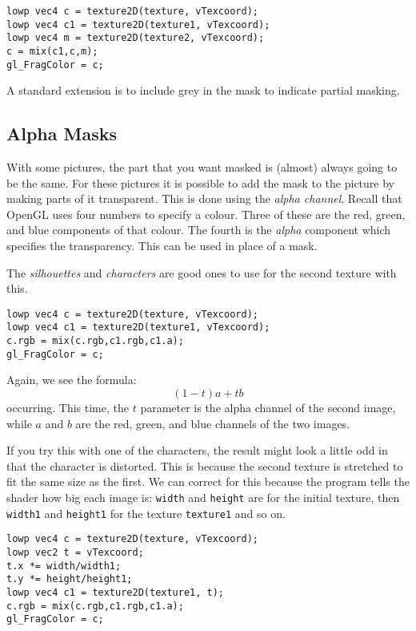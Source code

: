 \documentclass[
  html5,%
  mathml,%
  use filename%
]{internet}
\begin{document}
\begin{tcolorbox}
\begin{verbatim}
lowp vec4 c = texture2D(texture, vTexcoord);
lowp vec4 c1 = texture2D(texture1, vTexcoord);
lowp vec4 m = texture2D(texture2, vTexcoord);
c = mix(c1,c,m);
gl_FragColor = c;
\end{verbatim}
\end{tcolorbox}

A standard extension is to include grey in the mask to indicate partial masking. 

\subsection{Alpha Masks}

With some pictures, the part that you want masked is (almost) always going to be the same.
For these pictures it is possible to add the mask to the picture by making parts of it transparent.
This is done using the \emph{alpha channel}.
Recall that OpenGL uses four numbers to specify a colour.
Three of these are the red, green, and blue components of that colour.
The fourth is the \emph{alpha} component which specifies the transparency.
This can be used in place of a mask.

The \emph{silhouettes} and \emph{characters} are good ones to use for the second texture with this.

\begin{tcolorbox}
\begin{verbatim}
lowp vec4 c = texture2D(texture, vTexcoord);
lowp vec4 c1 = texture2D(texture1, vTexcoord);
c.rgb = mix(c.rgb,c1.rgb,c1.a);
gl_FragColor = c;
\end{verbatim}
\end{tcolorbox}

Again, we see the formula:
%
\[
  (1 - t) a + t b
  \]
%
occurring.
This time, the \(t\) parameter is the alpha channel of the second image, while \(a\) and \(b\) are the red, green, and blue channels of the two images.

If you try this with one of the characters, the result might look a little odd in that the character is distorted.
This is because the second texture is stretched to fit the same size as the first.
We can correct for this because the program tells the shader how big each image is: \verb+width+ and \verb+height+ are for the initial texture, then \verb+width1+ and \verb+height1+ for the texture \verb+texture1+ and so on. 


\begin{tcolorbox}
\begin{verbatim}
lowp vec4 c = texture2D(texture, vTexcoord);
lowp vec2 t = vTexcoord;
t.x *= width/width1;
t.y *= height/height1;
lowp vec4 c1 = texture2D(texture1, t);
c.rgb = mix(c.rgb,c1.rgb,c1.a);
gl_FragColor = c;
\end{verbatim}
\end{tcolorbox}
\end{document}
